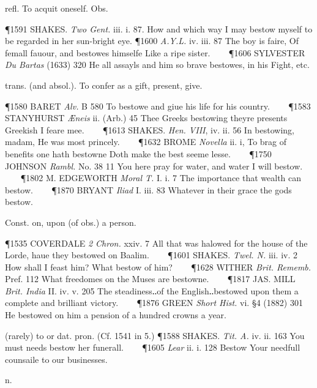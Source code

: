 \begin{description}[wide, labelwidth=!, labelindent=0pt]
\begin{myenumerate}
 refl. To acquit oneself. Obs.

\P 1591 SHAKES.  \textit{Two Gent.} iii. i. 87. How and which way I may bestow myself to be regarded in her sun-bright eye.
\P 1600 \textit{A.Y.L.} iv. iii. 87 The boy is faire, Of femall fauour, and bestowes himselfe Like a ripe sister.    
\P 1606 SYLVESTER  \textit{Du Bartas} (1633) 320 He all assayls and him so brave bestowes, in his Fight, etc.

 trans. (and absol.). To confer as a gift, present, give.

\P 1580 BARET  \textit{Alv.} B 580 To bestowe and giue his life for his country.    
\P 1583 STANYHURST  \textit{Æneis} ii. (Arb.) 45 Thee Greeks bestowing theyre presents Greekish I feare mee.    
\P 1613 SHAKES.  \textit{Hen. VIII}, iv. ii. 56 In bestowing, madam, He was most princely.    
\P 1632 BROME  \textit{Novella} ii. i, To brag of benefits one hath bestowne Doth make the best seeme lesse.    
\P 1750 JOHNSON  \textit{Rambl.} No. 38 11 You here pray for water, and water I will bestow.    
\P 1802 M. EDGEWORTH  \textit{Moral T.} I. i. 7 The importance that wealth can bestow.    
\P 1870 BRYANT  \textit{Iliad} I. iii. 83 Whatever in their grace the gods bestow.

 Const. on, upon (of obs.) a person.

\P 1535 COVERDALE  \textit{2 Chron.} xxiv. 7 All that was halowed for the house of the Lorde, haue they bestowed on Baalim.    
\P 1601 SHAKES.  \textit{Twel. N.} iii. iv. 2 How shall I feast him? What bestow of him?    
\P 1628 WITHER  \textit{Brit. Rememb.} Pref. 112 What freedomes on the Muses are bestowne.    
\P 1817 JAS. MILL  \textit{Brit. India} II. iv. v. 205 The steadiness‥of the English‥bestowed upon them a complete and brilliant victory.    
\P 1876 GREEN  \textit{Short Hist.} vi. §4 (1882) 301 He bestowed on him a pension of a hundred crowns a year.

 (rarely) to or dat. pron. (Cf. 1541 in 5.)
\P 1588 SHAKES.  \textit{Tit. A.} iv. ii. 163 You must needs bestow her funerall.    
\P 1605 \textit{Lear} ii. i. 128 Bestow Your needfull counsaile to our businesses.
\end{myenumerate}


 n.

\noindent {}



\end{description}
